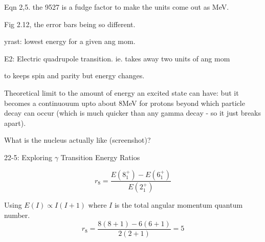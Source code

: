 Eqn 2,5. the 9527 is a fudge factor to make the units come out as MeV. 

Fig 2.12, the error bars being so different.


yrast: lowest energy for a given ang mom. 

E2: Electric quadrupole transition. ie. takes away two units of ang mom 

 to  keeps spin and parity but energy changes. 

Theoretical limit to the amount of energy an excited state can have: but it becomes a continuouum upto about 8MeV for protons beyond which particle decay can occur (which is much quicker than any gamma decay - so it just breaks apart).


What is the nucleus actually like (screenshot)?


\begin{example}{2}{2-5: Exploring \(\gamma\) Transition Energy Ratios}

\[r_8 = \frac{E(8^+_1) - E(6^+_1)}{E(2^+_1)}\]


Using \(E(I) \propto I(I+1)\) where \(I\) is the total angular momentum quantum number.
\[r_8 = \frac{8(8+1) - 6(6+1)}{2(2+1)} = 5\]
\end{example}

